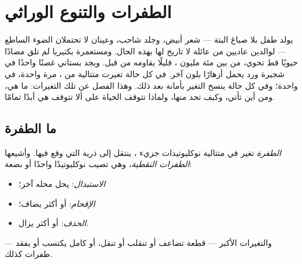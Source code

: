 \chapter{الطفرات والتنوع الوراثي}\label{ch:g11:mutations}

يولد طفل بلا صباغ البتة --- شعر أبيض، وجلد شاحب، وعينان لا تحتملان
الضوء الساطع --- لوالدين عاديين من عائلة لا تاريخ لها بهذه الحال.
ومستعمرة بكتيريا لم تلق مضادًا حيويًا قط تحوي، من بين مئة مليون ،
قليلًا يقاومه من قبل. ويجد بستاني غصنًا واحدًا في شجيرة ورد يحمل
أزهارًا بلون آخر. في كل حالة تغيرت متتالية من ، مرة واحدة، في 
واحدة؛ وفي كل حالة ينسخ التغير بأمانة بعد ذلك. وهذا الفصل عن تلك
التغيرات: ما هي، ومن أين تأتي، وكيف تحد  منها، ولماذا تتوقف
الحياة على ألا تتوقف هي أبدًا تمامًا.

\section{ما الطفرة}

\begin{definition}[الطفرة]\label{def:g11:mutations:mutation}
\emph{الطفرة} تغير في متتالية نوكليوتيدات جزيء ، ينتقل
إلى ذرية  التي وقع فيها. وأشيعها \emph{الطفرات النقطية}، وهي
تصيب نوكليوتيدًا واحدًا أو بضعة:
\begin{itemize}
  \item \emph{الاستبدال}:  يحل محله آخر؛
  \item \emph{الإقحام}:  أو أكثر يضاف؛
  \item \emph{الحذف}:  أو أكثر يزال.
\end{itemize}
والتغيرات الأكبر --- قطعة تضاعف أو تنقلب أو تنقل، أو  كامل يكتسب
أو يفقد --- طفرات كذلك.
\end{definition}

